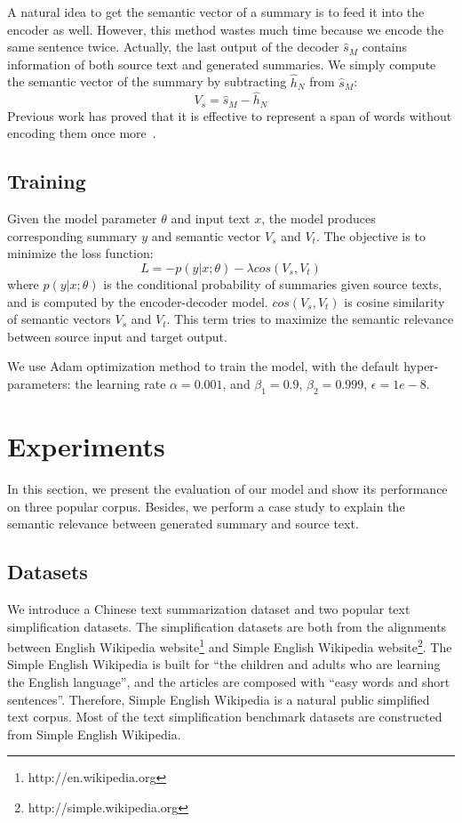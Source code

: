 \documentclass{clv3}
\begin{document}
\begin{CJK*}{UTF8}{gbsn}
A natural idea to get the semantic vector of a summary is to feed it into the encoder as well. However, this method wastes much time because we encode the same sentence twice. Actually, the last output of the decoder $\hat{s}_M$ contains information of both source text and generated summaries. We simply compute the semantic vector of the summary by subtracting $\hat{h}_N$ from $\hat{s}_M$:
\begin{equation}
V_{s}=\hat{s}_M-\hat{h}_N
\end{equation}
Previous work has proved that it is effective to represent a span of words without encoding them once more~\cite{wang16}.


\subsection{Training}

Given the model parameter $\theta$ and input text $x$, the model produces corresponding summary $y$ and semantic vector $V_s$ and $V_t$. The objective is to minimize the loss function:
\begin{equation}
L=-p(y|x;\theta)-\lambda cos(V_s,V_t)
\end{equation}
where $p(y|x;\theta)$ is the conditional probability of summaries given source texts, and is computed by the encoder-decoder model. $cos(V_s,V_t)$ is cosine similarity of semantic vectors $V_s$ and $V_t$. This term tries to maximize the semantic relevance between source input and target output.

We use Adam optimization method to train the model, with the default hyper-parameters: the learning rate $\alpha=0.001$, and $\beta_{1}=0.9$, $\beta_{2}=0.999$, $\epsilon=1e-8$.


\section{Experiments}

In this section, we present the evaluation of our model and show its performance on three popular corpus. Besides, we perform a case study to explain the semantic relevance between generated summary and source text.

\subsection{Datasets}

We introduce a Chinese text summarization dataset and two popular text simplification datasets. The simplification datasets are both from the alignments between English Wikipedia website\footnote{http://en.wikipedia.org} and Simple English Wikipedia website\footnote{http://simple.wikipedia.org}. The Simple English Wikipedia is built for ``the children and adults who are learning the English language'', and the articles are composed with ``easy words and short sentences''. Therefore, Simple English Wikipedia is a natural public simplified text corpus. Most of the text simplification benchmark datasets are constructed from Simple English Wikipedia.



\end{CJK*}
\end{document}

